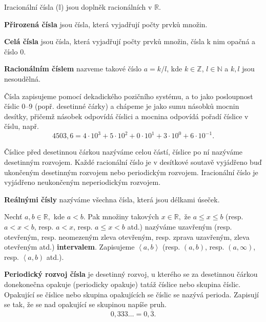 Iracionální čísla ($\mathbb{I}$) jsou doplněk racionálních v $\mathbb{R}$.

\begin{definition}
  \textbf{Přirozená čísla} jsou čísla, která vyjadřují počty prvků množin.
\end{definition}

\begin{definition}
  \textbf{Celá čísla} jsou čísla, která vyjadřují počty prvků množin, čísla k nim opačná a číslo 0.
\end{definition}

\begin{definition}
  \textbf{Racionálním číslem} nazveme takové číslo $a = k/l$, kde $ k \in \mathbb{Z}$, $l \in \mathbb{N}$ a $k,l$ jsou nesoudělná.
\end{definition}

\begin{pozn}
  Čísla zapisujeme pomocí dekadického pozičního systému, a to jako posloupnost číslic 0--9 (popř. desetinné čárky) a chápeme je jako sumu násobků mocnin desítky, přičemž násobek odpovídá číslici a mocnina odpovídá pořadí číslice v číslu, např.
  $$4503{,}6=4\cdot 10^3+5\cdot 10^2 + 0 \cdot 10^1 + 3\cdot 10^0 + 6 \cdot 10^{-1}.$$

  Číslice před desetinnou čárkou nazýváme celou částí, číslice po ní nazýváme desetinným rozvojem. Každé racionální číslo je v desítkové soutavě vyjádřeno buď ukončeným desetinným rozvojem nebo periodickým rozvojem. Iracionální číslo je vyjádřeno neukončeným neperiodickým rozvojem.
\end{pozn}

\begin{definition}
  \textbf{Reálnými čísly} nazýváme všechna čísla, která jsou délkami úseček.
\end{definition}

\begin{definition}
  Nechť $a,b \in \mathbb{R},$ kde $a<b$. Pak množiny takových $x\in \mathbb{R},$ že $a\leq x\leq b$
  (resp. $a < x < b$, resp. $a < x$, resp. $a \leq x < b$ atd.) nazýváme uzavřeným
  (resp. otevřeným, resp. neomezeným zleva otevřeným, resp. zprava uzavřeným, zleva otevřeným atd.) \textbf{intervalem}. Zapisujeme $\left< a,b\right>$ (resp. $\left(a,b\right)$, resp. $(a, \infty)$, resp. $\left< a, b\right)$ atd.).
\end{definition}

\begin{definition}
  \textbf{Periodický rozvoj čísla} je desetinný rozvoj, u kterého se za desetinnou čárkou donekonečna opakuje (periodicky opakuje) tatáž číslice nebo skupina číslic. Opakující se číslice nebo skupina opakujících se číslic se nazývá perioda. Zapisují se tak, že se nad opakující se skupinou napíše pruh.
  $$0{,}333\hdots = 0{,}\overline{3}.$$
\end{definition}

